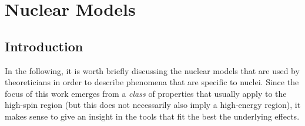 \chapter{Nuclear Models}

\section{Introduction}

In the following, it is worth briefly discussing the nuclear models that are used by theoreticians in order to describe phenomena that are specific to nuclei. Since the focus of this work emerges from a \emph{class} of properties that usually apply to the high-spin region (but this does not necessarily also imply a high-energy region), it makes sense to give an insight in the tools that fit the best the underlying effects.